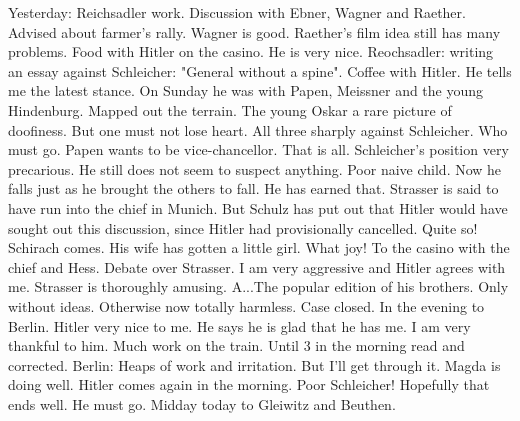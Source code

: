 Yesterday: Reichsadler work. Discussion with Ebner, Wagner and Raether. Advised about farmer's rally. Wagner is good. Raether's film idea still has many problems. Food with Hitler on the casino. He is very nice. Reochsadler: writing an essay against Schleicher: "General without a spine". Coffee with Hitler. He tells me the latest stance. On Sunday he was with Papen, Meissner and the young Hindenburg. Mapped out the terrain. The young Oskar a rare picture of doofiness. But one must not lose heart. All three sharply against Schleicher. Who must go. Papen wants to be vice-chancellor. That is all. Schleicher's position very precarious. He still does not seem to suspect anything. Poor naive child. Now he falls just as he brought the others to fall. He has earned that. Strasser is said to have run into the chief in Munich. But Schulz has put out that Hitler would have sought out this discussion, since Hitler had provisionally cancelled. Quite so! Schirach comes. His wife has gotten a little girl. What joy! To the casino with the chief and Hess. Debate over Strasser. I am very aggressive and Hitler agrees with me. Strasser is thoroughly amusing. A...The popular edition of his brothers. Only without ideas. Otherwise now totally harmless. Case closed. In the evening to Berlin. Hitler very nice to me. He says he is glad that he has me. I am very thankful to him. Much work on the train. Until 3 in the morning read and corrected. Berlin: Heaps of work and irritation. But I'll get through it. Magda is doing well. Hitler comes again in the morning. Poor Schleicher! Hopefully that ends well. He must go. Midday today to Gleiwitz and Beuthen.


